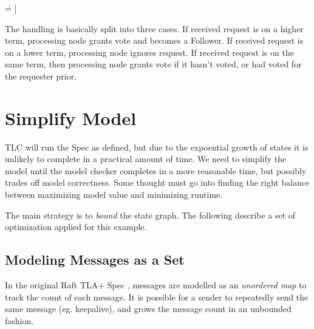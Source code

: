 \documentclass{report}
\begin{document}
\begin{tlatex}
{ \.{=} ]}%
 \@x{\@s{48.01} \.{\land} messages \.{'} \.{=} AddMessage ( [ fSrc \.{\mapsto}
 i ,\,}%
%
%
%
\@x{\@s{180.15} fSuccess \.{\mapsto} 1 ] ,\,}%
%
\end{tlatex}
\newline

The handling is basically split into three cases. If received request is on a
higher term, processing node grants vote and becomes a Follower. If received
request is on a lower term, processing node ignores request. If received request
is on the same term, then processing node grants vote if it hasn't voted, or had
voted for the requester prior.

\section{Simplify Model}

TLC will run the Spec as defined, but due to the expoential growth of states it
is unlikely to complete in a practical amount of time. We need to simplify the
model until the model checker completes in a more reasonable time, but possibly
trades off model correctness. Some thought must go into finding the right
balance between maximizing model value and minimizing runtime.\newline

The main strategy is to \textit{bound} the state graph. The following describe a
set of optimization applied for this example.

\subsection{Modeling Messages as a Set}

In the original Raft TLA+ Spec \cite{raft_tla}, messages are modelled as an
\textit{unordered map} to track the count of each message. It is possible for a
sender to repeatedly send the same message (eg. keepalive), and grows the 
message count in an unbounded fashion.\newline
\end{document}
